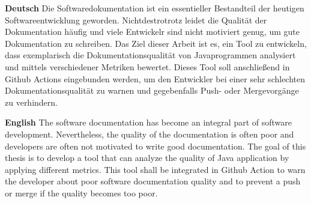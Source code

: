 \textbf{Deutsch}
Die Softwaredokumentation ist ein essentieller Bestandteil der  heutigen Softwareentwicklung geworden. Nichtdestrotrotz leidet die Qualität der Dokumentation häufig und viele Entwickelr sind nicht motiviert genug, um gute Dokumentation zu schreiben. Das Ziel dieser Arbeit ist es, ein Tool zu entwickeln, dass exemplarisch die Dokumentationsqualität von Javaprogrammen analysiert und mittels verschiedener Metriken bewertet. Dieses Tool soll anschließend in Github Actions eingebunden werden, um den Entwickler bei einer sehr schlechten Dokumentationsqualität zu warnen und gegebenfalls Push- oder Mergevorgänge zu verhindern.

\bigskip

\noindent
\textbf{English} 
The software documentation has become an integral part of software development. Nevertheless, the quality of the documentation is often poor and developers are often not motivated to write good documentation. The goal of this thesis is to develop a tool that can analyze the quality of Java application by applying different metrics. This tool shall be integrated in Github Action to warn the developer about poor software documentation quality and to prevent a push or merge if the quality becomes too poor.  

